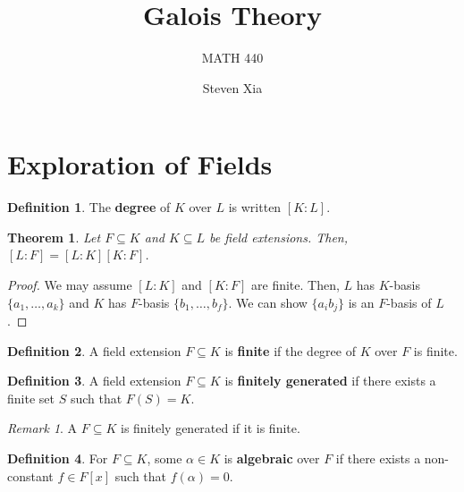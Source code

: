 \documentclass[
    parskip=half,
    toc=flat,
    toc=sectionentrydotfill,
]{scrartcl}  %
\title{Galois Theory}
\subtitle{MATH 440}
\author{Steven Xia}
\theoremstyle{definition}
\newtheorem{definition}{Definition}[section]
\theoremstyle{plain}
\newtheorem{theorem}{Theorem}[section]
\theoremstyle{remark}
\newtheorem{remark}{Remark}[section]
\begin{document}
\maketitle

\begin{minipage}{\textwidth} %
\begin{quote} 
\end{quote}
\end{minipage}

\tableofcontents


\section{Exploration of Fields}

\begin{definition}
    The \textbf{degree} of $K$ over $L$ is written $[K:L]$.
\end{definition}

\begin{theorem}
    Let $F\subseteq K$ and $K\subseteq L$ be field extensions.
    Then, $[L:F]=[L:K][K:F]$.
\end{theorem}

\begin{proof}
    We may assume $[L:K]$ and $[K:F]$ are finite.
    Then, $L$ has $K$-basis $\{a_1,\dots,a_k\}$ and $K$ has $F$-basis $\{b_1,\dots,b_f\}$.
    We can show $\{a_ib_j\}$ is an $F$-basis of $L$.
\end{proof}

\begin{definition}
    A field extension $F\subseteq K$ is \textbf{finite} if the degree of $K$
    over $F$ is finite.
\end{definition}

\begin{definition}
    A field extension $F\subseteq K$ is \textbf{finitely generated} if there
    exists a finite set $S$ such that $F(S)=K$.
\end{definition}

\begin{remark}
    \label{thm: finite implies finitely generated}
    A $F\subseteq K$ is finitely generated if it is finite.
\end{remark}

\begin{definition}
    For $F\subseteq K$, some $\alpha\in K$ is \textbf{algebraic} over $F$ if
    there exists a non-constant $f\in F[x]$ such that $f(\alpha)=0$.
\end{definition}
\end{document}
